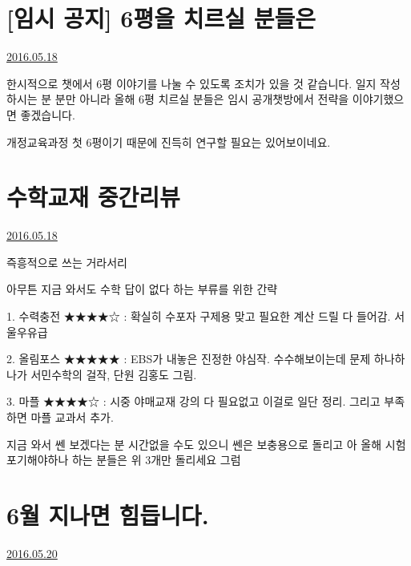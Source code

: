 \section{[임시 공지] 6평을 치르실 분들은}
\href{https://www.kockoc.com/Apoc/779984}{2016.05.18}

\vspace{5mm}

한시적으로 챗에서 6평 이야기를 나눌 수 있도록 조치가 있을 것 같습니다.
일지 작성하시는 분 분만 아니라 올해 6평 치르실 분들은 임시 공개챗방에서 전략을 이야기했으면 좋겠습니다.
\vspace{5mm}

개정교육과정 첫 6평이기 때문에 진득히 연구할 필요는 있어보이네요.





\section{수학교재 중간리뷰}
\href{https://www.kockoc.com/Apoc/780165}{2016.05.18}

\vspace{5mm}

즉흥적으로 쓰는 거라서리
\vspace{5mm}

아무튼 지금 와서도 수학 답이 없다 하는 부류를 위한 간략
\vspace{5mm}

\item 1. 수력충전 ★★★★☆ : 확실히 수포자 구제용 맞고 필요한 계산 드릴 다 들어감. 서울우유급
\item 2. 올림포스 ★★★★★ : EBS가 내놓은 진정한 야심작. 수수해보이는데 문제 하나하나가 서민수학의 걸작, 단원 김홍도 그림.
\item 3. 마플 ★★★★☆ : 시중 야매교재 강의 다 필요없고 이걸로 일단 정리. 그리고 부족하면 마플 교과서 추가.
\vspace{5mm}

지금 와서 쎈 보겠다는 분 시간없을 수도 있으니 쎈은 보충용으로 돌리고
아 올해 시험 포기해야하나 하는 분들은 위 3개만 돌리세요 그럼
\vspace{5mm}










\section{6월 지나면 힘듭니다.}
\href{https://www.kockoc.com/Apoc/784341}{2016.05.20}

